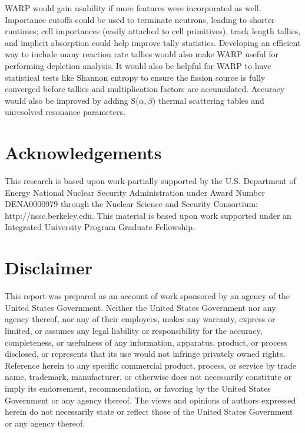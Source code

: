 \documentclass[preprint,12pt]{elsarticle}
\begin{document}
WARP would gain usability if more features were incorporated as well.  Importance cutoffs could be used to terminate neutrons, leading to shorter runtimes; cell importances (easily attached to cell primitives), track length tallies, and implicit absorption could help improve tally statistics.  Developing an efficient way to include many reaction rate tallies would also make WARP useful for performing depletion analysis.  It would also be helpful for WARP to have statistical tests like Shannon entropy to ensure the fission source is fully converged before tallies and multiplication factors are accumulated.  Accuracy would also be improved by adding S($\alpha,$$\beta$) thermal scattering tables and unresolved resonance parameters.


\section*{Acknowledgements}
\label{sec:ack}

This research is based upon work partially supported by the U.S. Department of Energy National Nuclear Security Administration under Award Number DENA0000979 through the Nuclear Science and Security Consortium: http://nssc.berkeley.edu.
This material is based upon work supported under an Integrated University Program Graduate Fellowship.

\section*{Disclaimer}
\label{sec:disc}

This report was prepared as an account of work sponsored by an agency of the United States Government. Neither the United States Government nor any agency thereof, nor any of their employees, makes any warranty, express or limited, or assumes any legal liability or responsibility for the accuracy, completeness, or usefulness of any information, apparatus, product, or process disclosed, or represents that its use would not infringe privately owned rights. Reference herein to any specific commercial product, process, or service by trade name, trademark, manufacturer, or otherwise does not necessarily constitute or imply its endorsement, recommendation, or favoring by the United States Government or any agency thereof. The views and opinions of authors expressed herein do not necessarily state or reflect those of the United States Government or any agency thereof.



\end{document}
